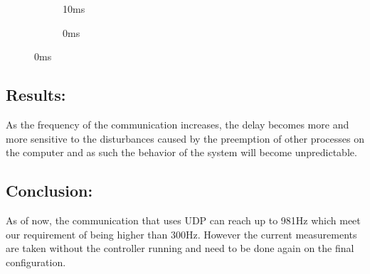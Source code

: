 \begin{figure}[H]
\centering
	\begin{subfigure}{.45\textwidth}
	    \centering
	    
	    \caption{10ms}
	\end{subfigure} 
	\begin{subfigure}{.45\textwidth}
	    \centering
	    
	    \caption{0ms}
	\end{subfigure} 
	\label{Representation of the RTT delay for different frequencies}
\end{figure}

\subsection*{Results:}

As the frequency of the communication increases, the delay becomes more and more sensitive to the disturbances caused by the preemption of other processes on the computer and as such the behavior of the system will become unpredictable. 

\subsection*{Conclusion:}

As of now, the communication that uses UDP can reach up to 981Hz which meet our requirement of being higher than 300Hz. However the current measurements are taken without the controller running and need to be done again on the final configuration.